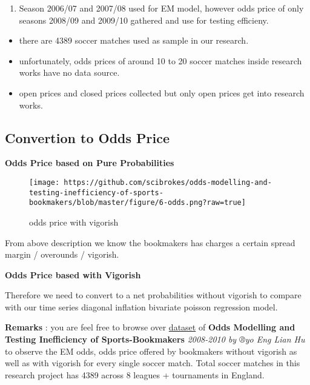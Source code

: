 \documentclass[article]{jss}
\providecommand{\tightlist}{%
  \setlength{\itemsep}{0pt}\setlength{\parskip}{0pt}}
\begin{document}
\begin{enumerate}
\def\labelenumi{\arabic{enumi}.}
\setcounter{enumi}{2}
\tightlist
\item
  Season 2006/07 and 2007/08 used for EM model, however odds price of
  only seasons 2008/09 and 2009/10 gathered and use for testing
  efficieny.
\end{enumerate}

\begin{itemize}
\tightlist
\item
  there are 4389 soccer matches used as sample in our research.
\item
  unfortunately, odds prices of around 10 to 20 soccer matches inside
  research works have no data source.
\item
  open prices and closed prices collected but only open prices get into
  research works.
\end{itemize}

\subsection{Convertion to Odds Price}\label{convertion-to-odds-price}

\textbf{Odds Price based on Pure Probabilities} \bigbreak

\begin{figure}[htbp]
\centering
\texttt{[image: https://github.com/scibrokes/odds-modelling-and-testing-inefficiency-of-sports-bookmakers/blob/master/figure/6-odds.png?raw=true]}
\caption{odds price with vigorish}
\end{figure}

From above description we know the bookmakers has charges a certain
spread margin / overounds / vigorish. \bigbreak

\textbf{Odds Price based with Vigorish} \bigbreak

Therefore we need to convert to a net probabilities without vigorish to
compare with our time series diagonal inflation bivariate poisson
regression model. \bigbreak

\textbf{Remarks} : you are feel free to browse over
\href{https://www.dropbox.com/home/Research\%20Project\%202}{dataset} of
\textbf{Odds Modelling and Testing Inefficiency of Sports-Bookmakers}
\emph{2008-2010 by ®yo Eng Lian Hu} to observe the EM odds, odds price
offered by bookmakers without vigorish as well as with vigorish for
every single soccer match. Total soccer matches in this research project
has 4389 across 8 leagues + tournaments in England.
\end{document}
